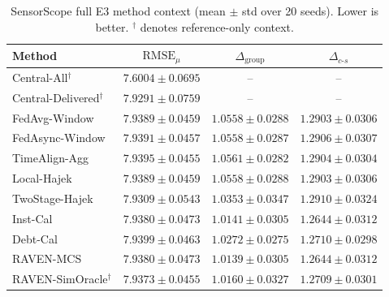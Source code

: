 \begin{table}[!htbp]
\centering
\caption{SensorScope full E3 method context (mean $\pm$ std over 20 seeds).
Lower is better.  $^\dagger$ denotes reference-only context.}
\label{tab:app_e3_sensorscope}
\scriptsize
\setlength{\tabcolsep}{3pt}
\begin{tabular*}{\columnwidth}{@{\extracolsep{\fill}}lccc}
\toprule
Method & $\mathrm{RMSE}_{\mu}$ & $\Delta_{\mathrm{group}}$ & $\Delta_{c\text{-}s}$\\
\midrule
Central-All$^{\dagger}$ & $7.6004\pm0.0695$ & -- & -- \\
Central-Delivered$^{\dagger}$ & $7.9291\pm0.0759$ & -- & -- \\
FedAvg-Window & $7.9389\pm0.0459$ & $1.0558\pm0.0288$ & $1.2903\pm0.0306$ \\
FedAsync-Window & $7.9391\pm0.0457$ & $1.0558\pm0.0287$ & $1.2906\pm0.0307$ \\
TimeAlign-Agg & $7.9395\pm0.0455$ & $1.0561\pm0.0282$ & $1.2904\pm0.0304$ \\
Local-Hajek & $7.9389\pm0.0459$ & $1.0558\pm0.0288$ & $1.2903\pm0.0306$ \\
TwoStage-Hajek & $7.9309\pm0.0543$ & $1.0353\pm0.0347$ & $1.2910\pm0.0324$ \\
Inst-Cal & $7.9380\pm0.0473$ & $1.0141\pm0.0305$ & $1.2644\pm0.0312$ \\
Debt-Cal & $7.9399\pm0.0463$ & $1.0272\pm0.0275$ & $1.2710\pm0.0298$ \\
RAVEN-MCS & $7.9380\pm0.0473$ & $1.0139\pm0.0305$ & $1.2644\pm0.0312$ \\
RAVEN-SimOracle$^{\dagger}$ & $7.9373\pm0.0455$ & $1.0160\pm0.0327$ & $1.2709\pm0.0301$ \\
\bottomrule
\end{tabular*}
\end{table}

